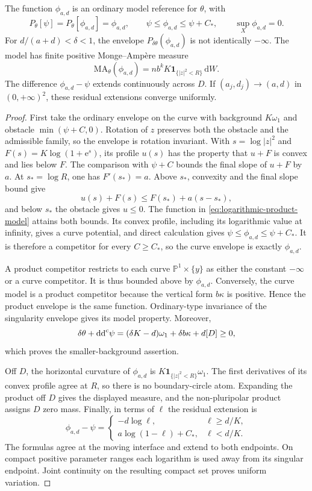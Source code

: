 \begin{proposition}\label{prop:logarithmic-product-model}
The function $\phi_{a,d}$ is an ordinary model reference for $\theta$, with
\[
 P_\theta[\psi]=P_\theta[\phi_{a,d}]=\phi_{a,d},\qquad
 \psi\leq\phi_{a,d}\leq\psi+C_*,\qquad \sup_X\phi_{a,d}=0.
\]
For $d/(a+d)<\delta<1$, the envelope $P_{\delta\theta}(\phi_{a,d})$ is not identically $-\infty$. The model has finite positive Monge--Amp\`ere measure
\[
 \mathrm{MA}_\theta(\phi_{a,d})
       =n b^kK\mathbf1_{\{|z|^2<R\}}\,\mathrm{d}W.
\]
The difference $\phi_{a,d}-\psi$ extends continuously across $D$. If $(a_j,d_j)\to(a,d)$ in $(0,+\infty)^2$, these residual extensions converge uniformly.
\end{proposition}
\begin{proof}
First take the ordinary envelope on the curve with background $K\omega_1$ and obstacle $\min(\psi+C,0)$. Rotation of $z$ preserves both the obstacle and the admissible family, so the envelope is rotation invariant. With $s=\log|z|^2$ and $F(s)=K\log(1+\mathrm{e}^s)$, its profile $u(s)$ has the property that $u+F$ is convex and lies below $F$. The comparison with $\psi+C$ bounds the final slope of $u+F$ by $a$. At $s_*=\log R$, one has $F'(s_*)=a$. Above $s_*$, convexity and the final slope bound give
\[
 u(s)+F(s)\leq F(s_*)+a(s-s_*),
\]
and below $s_*$ the obstacle gives $u\leq0$. The function in \eqref{eq:logarithmic-product-model} attains both bounds. Its convex profile, including its logarithmic value at infinity, gives a curve potential, and direct calculation gives $\psi\leq\phi_{a,d}\leq\psi+C_*$. It is therefore a competitor for every $C\geq C_*$, so the curve envelope is exactly $\phi_{a,d}$.

A product competitor restricts to each curve $\mathbb P^1\times\{y\}$ as either the constant $-\infty$ or a curve competitor. It is thus bounded above by $\phi_{a,d}$. Conversely, the curve model is a product competitor because the vertical form $b\kappa$ is positive. Hence the product envelope is the same function. Ordinary-type invariance of the singularity envelope gives its model property. Moreover,
\[
 \delta\theta+\mathrm{dd}^{\mathrm{c}}\psi
   =(\delta K-d)\omega_1+\delta b\kappa+d[D]\geq0,
\]
which proves the smaller-background assertion.

Off $D$, the horizontal curvature of $\phi_{a,d}$ is $K\mathbf1_{\{|z|^2<R\}}\omega_1$. The first derivatives of its convex profile agree at $R$, so there is no boundary-circle atom. Expanding the product off $D$ gives the displayed measure, and the non-pluripolar product assigns $D$ zero mass. Finally, in terms of $\ell$ the residual extension is
\[
 \phi_{a,d}-\psi=\begin{cases}
 -d\log\ell,&\ell\geq d/K,\\
 a\log(1-\ell)+C_*,&\ell<d/K.
 \end{cases}
\]
The formulas agree at the moving interface and extend to both endpoints. On compact positive parameter ranges each logarithm is used away from its singular endpoint. Joint continuity on the resulting compact set proves uniform variation.
\end{proof}

